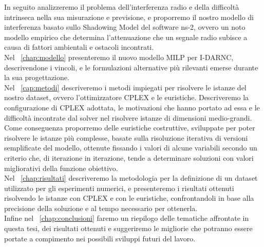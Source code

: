 In seguito analizzeremo il problema dell'interferenza radio e della difficoltà intrinseca nella sua misurazione e previsione, e proporremo il nostro modello di interferenza basato sullo Shadowing Model del software ns-2, ovvero un noto modello empirico che determina l'attenuazione che un segnale radio subisce a causa di fattori ambientali e ostacoli incontrati. \\
Nel \chaptername\ \ref{chap:modello} presenteremo il nuovo modello MILP per I-DARNC, descrivendone i vincoli, e le formulazioni alternative più rilevanti emerse durante la sua progettazione. \\
Nel \chaptername\ \ref{cap:metodi} descriveremo i metodi impiegati per risolvere le istanze del nostro dataset, ovvero l'ottimizzatore CPLEX e le euristiche. 
Descriveremo la configurazione di CPLEX adottata, le motivazioni che hanno portato ad essa e le difficoltà incontrate dal solver nel risolvere istanze di dimensioni medio-grandi. 
Come conseguenza proporremo delle euristiche costruttive, sviluppate per poter risolvere le istanze più complesse, basate sulla risoluzione iterativa di versioni semplificate del modello, ottenute fissando i valori di alcune variabili secondo un criterio che, di iterazione in iterazione, tende a determinare soluzioni con valori migliorativi della funzione obiettivo. \\
Nel \chaptername\ \ref{chap:risultati} descriveremo la metodologia per la definizione di un dataset utilizzato per gli esperimenti numerici, e presenteremo i risultati ottenuti risolvendo le istanze con CPLEX e con le euristiche, confrontandoli in base alla precisione della soluzione e al tempo necessario per ottenerla.\\
Infine nel \chaptername\ \ref{chap:conclusioni} faremo un riepilogo delle tematiche affrontate in questa tesi, dei risultati ottenuti e suggeriremo le migliorie che potranno essere portate a compimento nei possibili sviluppi futuri del lavoro. \\

